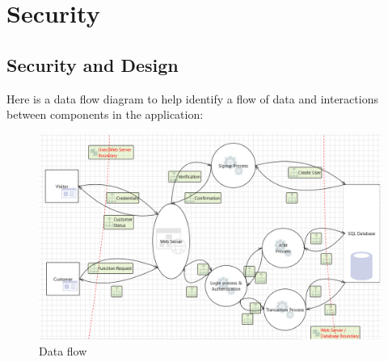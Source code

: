 
\chapter{Security
}\label{kap:security}

\section{Security and Design}

Here is a data flow diagram to help identify a flow of data and interactions between components in the application:

\begin{figure}[H]
   \centering
   \includegraphics[width=\textwidth]{pics/pic4 Data Flow.PNG}
   \caption{Data flow}
   \label{fig:cha2fig1dataflow}
\end{figure}


